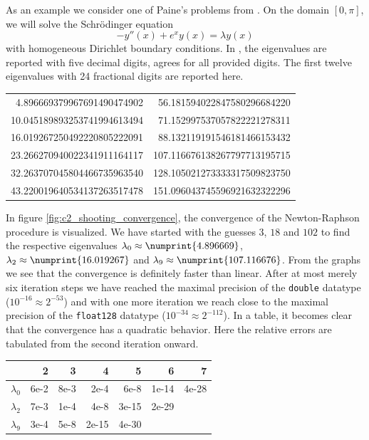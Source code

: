 As an example we consider one of Paine's problems from \cite{paine_correction_1981}. On the domain $[0, \pi]$, we will solve the Schrödinger equation
\begin{equation}\label{ref:equ_shooting_paine}
    -y''(x) + e^x y(x) = \lambda y(x)
\end{equation}
with homogeneous Dirichlet boundary conditions. In \cite{paine_correction_1981}, the eigenvalues are reported with five decimal digits, \pyslise{} agrees for all provided digits. The first twelve eigenvalues with 24 fractional digits are reported here.
\begin{center}
    \begin{tabular}{n{2}{24}n{3}{24}}
        4.896669379967691490474902  & 56.181594022847580296684220  \\
        10.045189893253741994613494 & 71.152997537057822221278311  \\
        16.019267250492220805222091 & 88.132119191546181466153432  \\
        23.266270940022341911164117 & 107.116676138267797713195715 \\
        32.263707045804466735963540 & 128.105021273333317509823750 \\
        43.220019640534137263517478 & 151.096043745596921632322296
    \end{tabular}
\end{center}

In figure \ref{fig:c2_shooting_convergence}, the convergence of the Newton-Raphson procedure is visualized. We have started with the guesses $3$, $18$ and $102$ to find the respective eigenvalues $\lambda_0 \approx \numprint{4.896669}$, $\lambda_2 \approx \numprint{16.019267}$  and $\lambda_9 \approx \numprint{107.116676}$. From the graphs we see that the convergence is definitely faster than linear. After at most merely six iteration steps we have reached the maximal precision of the \texttt{double} datatype ($10^{-16} \approx 2^{-53}$) and with one more iteration we reach close to the maximal precision of the \texttt{float128} datatype ($10^{-34} \approx 2^{-112}$). In a table, it becomes clear that the convergence has a quadratic behavior. Here the relative errors are tabulated from the second iteration onward.

\begin{center}
    \begin{tabular}{r|n{1}{0}n{1}{0}n{1}{0}n{1}{0}n{1}{0}n{1}{0}}
                                     & {2}  & {3}  & {4}   & {5}   & {6}   & {7}   \\
        \hline
        \rule{0pt}{2.6ex}$\lambda_0$ & 6e-2 & 8e-3 & 2e-4  & 6e-8  & 1e-14 & 4e-28 \\
        $\lambda_2$                  & 7e-3 & 1e-4 & 4e-8  & 3e-15 & 2e-29 &       \\
        $\lambda_9$                  & 3e-4 & 5e-8 & 2e-15 & 4e-30 &       &       \\
    \end{tabular}
\end{center}


